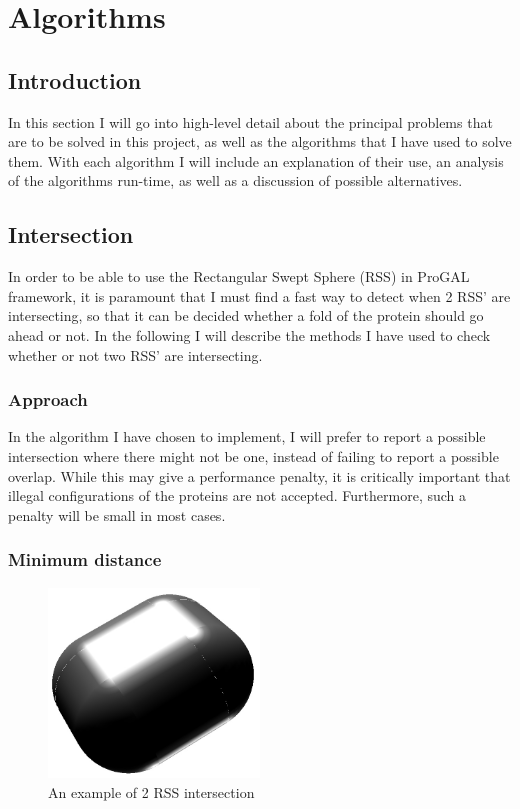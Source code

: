 
\section{Algorithms}
\label{algorithms}
\subsection{Introduction}
In this section I will go into high-level detail about the principal problems that are to be solved in this project, as well as the algorithms that I have used to solve them. With each algorithm I will include an explanation of their use, an analysis of the algorithms run-time, as well as a discussion of possible alternatives. 

\subsection{Intersection}
\label{intersection}
In order to be able to use the Rectangular Swept Sphere (RSS) in ProGAL framework, it is paramount that I must find a fast way to detect when 2 RSS' are intersecting, so that it can be decided whether a fold of the protein should go ahead or not. In the following I will describe the methods I have used to check whether or not two RSS' are intersecting.

\subsubsection{Approach}
In the algorithm I have chosen to implement, I will prefer to report a possible intersection where there might not be one, instead of failing to report a possible overlap. While this may give a performance penalty, it is critically important that illegal configurations of the proteins are not accepted. Furthermore, such a penalty will be small in most cases.

\subsubsection{Minimum distance}

\begin{figure}
\centering
\includegraphics[width=0.5\textwidth]{figures/normalInter}
\caption{\label{normal-inter}An example of 2 RSS intersection}
\end{figure}

